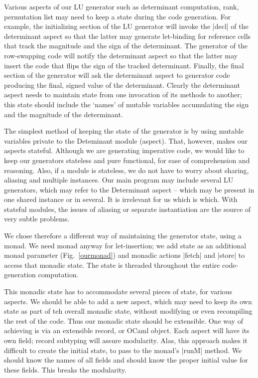 \documentclass[draft]{elsart}
\begin{document}
Various aspects of our LU generator such as determinant
computation, rank, permutation list may need to keep a state during
the code generation. For example, the initializing section of the LU
generator will invoke the |decl| of the determinant aspect so that the
latter may generate let-binding for reference cells that track the
magnitude and the sign of the determinant. The generator of the
row-swapping code will notify the determinant aspect so that the
latter may insert the code that flips the sign of the tracked
determinant. Finally, the final section of the generator will ask the
determinant aspect to generator code producing the final, signed value
of the determinant. Clearly the determinant aspect needs to maintain
state from one invocation of its methods to another; this state should
include the `names' of mutable variables accumulating the sign and the
magnitude of the determinant.

The simplest method of keeping the state of the generator is by using
mutable variables private to the Deteminant module (aspect). That,
however, makes our aspects stateful. Although we are generating
imperative code, we would like to keep our generators stateless and
pure functional, for ease of comprehension and reasoning. Also, if a
module is stateless, we do not have to worry about sharing, aliasing
and multiple instances. Our main program may include several LU
generators, which may refer to the Determinant aspect -- which may be
present in one shared instance or in several. It is irrelevant for us
which is which. With stateful modules, the issues of aliasing or
separate instantiation are the source of very subtle problems.

We chose therefore a different way of maintaining the generator state,
using a monad. We need monad anyway for let-insertion; we add state as
an additional monad parameter (Fig.~\ref{ourmonad}) and monadic
actions |fetch| and |store| to access that monadic state. The state is
threaded throughout the entire code-generation computation. 

This monadic state has to accommodate several pieces of state, for
various aspects. We should be able to add a new aspect, which may need
to keep its own state as part of teh overall monadic state, without
modifying or even recompiling the rest of the code. Thus our monadic
state should be extensible. One way of achieving is via an extensible
record, or OCaml object. Each aspect will have its own field; record
subtyping will assure modularity. Alas, this approach makes it
difficult to create the initial state, to pass to the monad's |runM|
method. We should know the names of all fields and should know the
proper initial value for these fields. This breaks the modularity.
\end{document}
